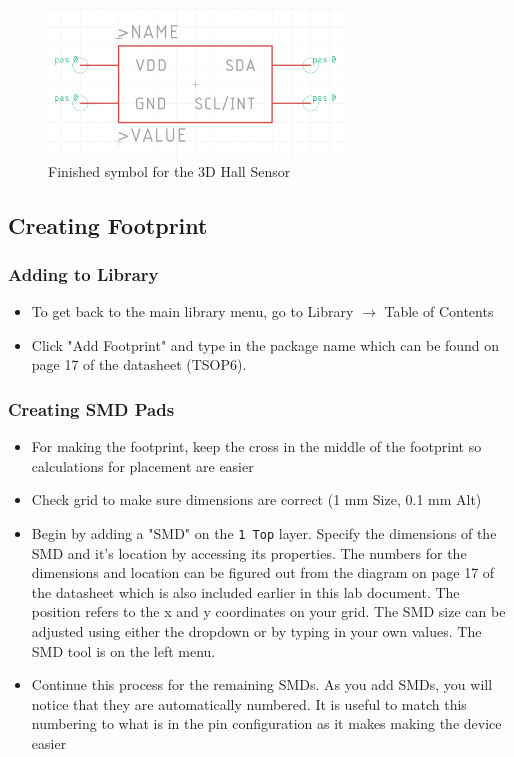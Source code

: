 \documentclass{article}
\begin{document}
\begin{figure}[h]
    \center
	\includegraphics[width=0.7\textwidth, keepaspectratio]{images/symbol.png}
	\caption{Finished symbol for the 3D Hall Sensor}
	\label{fig:symbol}
\end{figure}


\subsection{Creating Footprint}
\subsubsection{Adding to Library}
\begin{itemize}
    \item To get back to the main library menu, go to Library $\rightarrow$ Table of Contents
    \item Click "Add Footprint" and type in the package name which can be found on page 17 of the datasheet (TSOP6).
\end{itemize}
\subsubsection{Creating SMD Pads}
\begin{itemize}
    \item For making the footprint, keep the cross in the middle of the footprint so calculations for placement are easier
    \item Check grid to make sure dimensions are correct (1 mm Size, 0.1 mm Alt)
    \item Begin by adding a "SMD" on the \texttt{1 Top} layer. Specify the dimensions of the SMD and it's location by accessing its properties. The numbers for the dimensions and location can be figured out from the diagram on page 17 of the datasheet which is also included earlier in this lab document. The position refers to the x and y coordinates on your grid. The SMD size can be adjusted using either the dropdown or by typing in your own values. The SMD tool is on the left menu.
    \item Continue this process for the remaining SMDs. As you add SMDs, you will notice that they are automatically numbered. It is useful to match this numbering to what is in the pin configuration as it makes making the device easier
\end{itemize}
\end{document}

